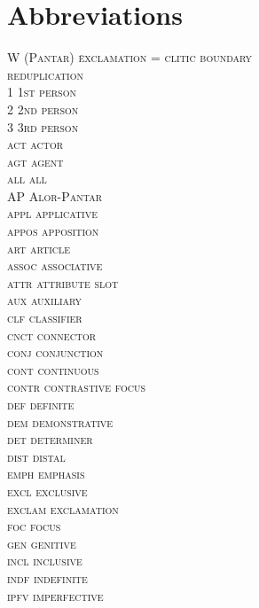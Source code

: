 \clearpage\section*{Abbreviations}
\begin{multicols}{2}
\begin{tabbing}
\scshape W \rm (Pantar) \= exclamation\kill
\scshape = \> clitic boundary\\
\scshape {\Tilde} \> reduplication\\
\scshape 1 \> 1st person\\
\scshape 2 \> 2nd person\\
\scshape 3 \> 3rd person\\
\scshape act \> actor\\
\scshape agt \> agent\\
\scshape all \> all\\
\scshape AP \> Alor-Pantar\\
\scshape appl \> applicative\\
\scshape appos \> apposition\\
\scshape art \> article\\
\scshape assoc \> associative\\
\scshape attr \> attribute slot\\
\scshape aux \> auxiliary\\
\scshape clf \> classifier\\
\scshape cnct \> connector\\
\scshape conj \> conjunction\\
\scshape cont \> continuous\\
\scshape contr \> contrastive focus\\
\scshape def \> definite\\
\scshape dem \> demonstrative\\
\scshape det \> determiner\\
\scshape dist \> distal\\
\scshape emph \> emphasis\\
\scshape excl \> exclusive\\
\scshape exclam \> exclamation\\
\scshape foc \> focus\\
\scshape gen \> genitive\\
\scshape incl \> inclusive\\
\scshape indf \> indefinite\\
\scshape ipfv \> imperfective\\

\end{tabbing}
\end{multicols}
